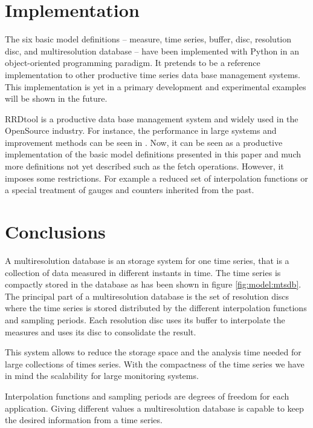 \section{Implementation}\label{sec:implementation}

The six basic model definitions -- measure, time series, buffer, disc,
resolution disc, and multiresolution database -- have been implemented
with Python in an object-oriented programming paradigm. It pretends to
be a reference implementation to other productive time series data
base management systems. This implementation is yet in a primary
development and experimental examples will be shown in the future.

RRDtool \parencite{rrdtool} is a productive data base
management system and widely used in the OpenSource industry. For
instance, the performance in large systems and improvement methods can
be seen in \cite{lisa07:plonka}. Now, it can be seen as a
productive implementation of the basic model definitions presented in
this paper and much more definitions not yet described such as the
fetch operations. However, it imposes some restrictions. For example a
reduced set of interpolation functions or a special treatment of
gauges and counters inherited from the past.

\section{Conclusions}\label{sec:conclusion}

A multiresolution database is an storage system for one time series, that
is a collection of data measured in different instants in time.  The
time series is compactly stored in the database as has been shown in
figure \ref{fig:model:mtsdb}. The principal part of a multiresolution
database is the set of resolution discs where the time series is
stored distributed by the different interpolation functions and
sampling periods. Each resolution disc uses its buffer to interpolate
the measures and uses its disc to consolidate the result. 

This system allows to reduce the storage space and the analysis time
needed for large collections of times series.  With the compactness of
the time series we have in mind the scalability for large monitoring
systems.

Interpolation functions and sampling periods are degrees
of freedom for each application. Giving different values a multiresolution
database is capable to keep the desired information from a time series.



